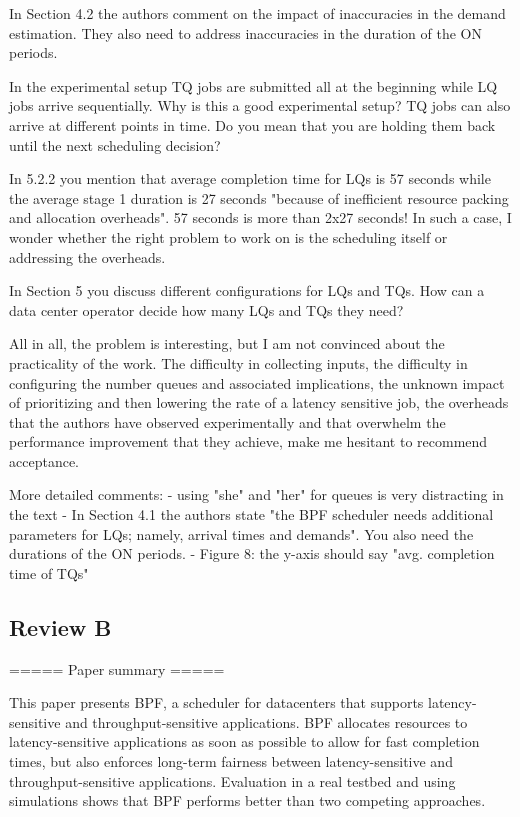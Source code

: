  In Section 4.2 the authors comment on the impact of inaccuracies in the demand estimation. They also need to address inaccuracies in the duration of the ON periods.
 
 In the experimental setup TQ jobs are submitted all at the beginning while LQ jobs arrive sequentially. Why is this a good experimental setup? TQ jobs can also arrive at different points in time. Do you mean that you are holding them back until the next scheduling decision?
 
 In 5.2.2 you mention that average completion time for LQs is 57 seconds while the average stage 1 duration is 27 seconds "because of inefficient resource packing and allocation overheads". 57 seconds is more than 2x27 seconds! In such a case, I wonder whether the right problem to work on is the scheduling itself or addressing the overheads.
 
 In Section 5 you discuss different configurations for LQs and TQs. How can a data center operator decide how many LQs and TQs they need?
 
 All in all, the problem is interesting, but I am not convinced about the practicality of the work. The difficulty in collecting inputs, the difficulty in configuring the number queues and associated implications, the unknown impact of prioritizing and then lowering the rate of a latency sensitive job, the overheads that the authors have observed experimentally and that overwhelm the performance improvement that they achieve, make me hesitant to recommend acceptance.
 
 More detailed comments:
 - using "she" and "her" for queues is very distracting in the text
 - In Section 4.1 the authors state "the BPF scheduler needs additional parameters for LQs; namely, arrival times and demands". You also need the durations of the ON periods.
 - Figure 8: the y-axis should say "avg. completion time of TQs"


\subsection{Review B}

===== Paper summary =====

This paper presents BPF, a scheduler for datacenters that supports
latency-sensitive and throughput-sensitive applications.  BPF
allocates resources to latency-sensitive applications as soon as
possible to allow for fast completion times, but also enforces
long-term fairness between latency-sensitive and
throughput-sensitive applications.  Evaluation in a real testbed and
using simulations shows that BPF performs better than two competing
approaches.

